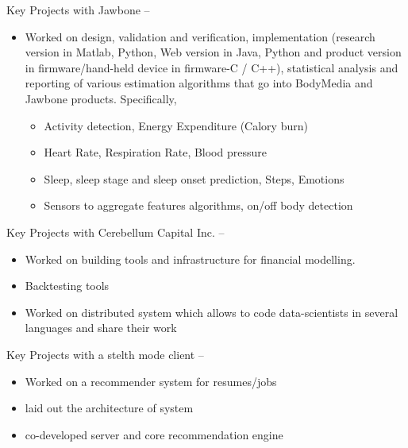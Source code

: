 \documentclass[letterpaper,MMMyyyy,nonstop]{simpleresumecv}
\begin{document}
\begin{body}
\GapNoBreak
\BulletItem
Key Projects with Jawbone
\hfill
{} --
\begin{detail}
\begin{itemize}
\item Worked on design, validation and verification, implementation (research version in Matlab,
Python, Web version in Java, Python and product version in firmware/hand-held device in
firmware-C / C++), statistical analysis and reporting of various estimation algorithms that go
into BodyMedia and Jawbone products. Specifically,
\begin{itemize}
   \item Activity detection, Energy Expenditure (Calory burn)
   \item Heart Rate, Respiration Rate, Blood pressure
   \item Sleep, sleep stage and sleep onset prediction, Steps, Emotions
   \item Sensors to aggregate features algorithms, on/off body detection
\end{itemize}

\end{itemize}

\GapNoBreak
\BulletItem
Key Projects with Cerebellum Capital Inc.
\hfill
{} --
\begin{detail}
\begin{itemize}
\item Worked on building tools and infrastructure for financial modelling.
\item Backtesting tools
\item Worked on distributed system which allows to code data-scientists in
several languages and share their work
\end{itemize}

\GapNoBreak
\BulletItem
Key Projects with a stelth mode client
\hfill
{} --
\begin{detail}
\begin{itemize}
\item Worked on a recommender system for resumes/jobs
\item laid out the architecture of system
\item co-developed server and core recommendation engine
\end{itemize}



\end{detail}
\end{detail}
\end{detail}
\end{body}
\end{document}
